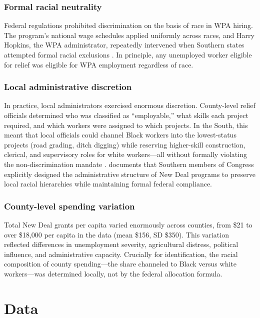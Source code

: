 \documentclass[12pt]{article}
\begin{document}
\subsubsection*{Formal racial neutrality} Federal regulations prohibited discrimination on the basis of race in WPA hiring. The program's national wage schedules applied uniformly across races, and Harry Hopkins, the WPA administrator, repeatedly intervened when Southern states attempted formal racial exclusions \citep{sitkoff1978}. In principle, any unemployed worker eligible for relief was eligible for WPA employment regardless of race.

\subsubsection*{Local administrative discretion} In practice, local administrators exercised enormous discretion. County-level relief officials determined who was classified as ``employable,'' what skills each project required, and which workers were assigned to which projects. In the South, this meant that local officials could channel Black workers into the lowest-status projects (road grading, ditch digging) while reserving higher-skill construction, clerical, and supervisory roles for white workers---all without formally violating the non-discrimination mandate \citep{alston1984, taylor2024}. \citet{quadagno1994} documents that Southern members of Congress explicitly designed the administrative structure of New Deal programs to preserve local racial hierarchies while maintaining formal federal compliance.

\subsubsection*{County-level spending variation} Total New Deal grants per capita varied enormously across counties, from \$21 to over \$18,000 per capita in the \citet{fishback2003} data (mean \$156, SD \$350). This variation reflected differences in unemployment severity, agricultural distress, political influence, and administrative capacity. Crucially for identification, the racial composition of county spending---the share channeled to Black versus white workers---was determined locally, not by the federal allocation formula.

\section{Data}
\end{document}
